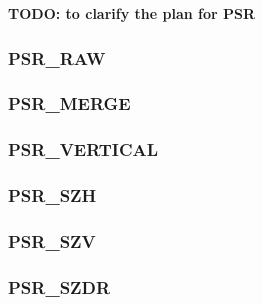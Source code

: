 \documentclass[a4paper,11pt,pdftex,twoside]{scrartcl}
\renewcommand{\bf}{\normalfont \bfseries}
\begin{document}
{{{{\bf TODO: to clarify the plan for PSR}

\subsubsection{PSR\_RAW}
\label{subsec_psr_raw}

%
%


\subsubsection{PSR\_MERGE}
\label{subsec_psr_merge}

%
%

\subsubsection{PSR\_VERTICAL}
\label{subsec_psr_vertical}

\subsubsection{PSR\_SZH}
\label{subsec_psr_szh}

\subsubsection{PSR\_SZV}
\label{subsec_psr_szv}

\subsubsection{PSR\_SZDR}
\label{subsec_psr_szdr}

}}}
\end{document}
